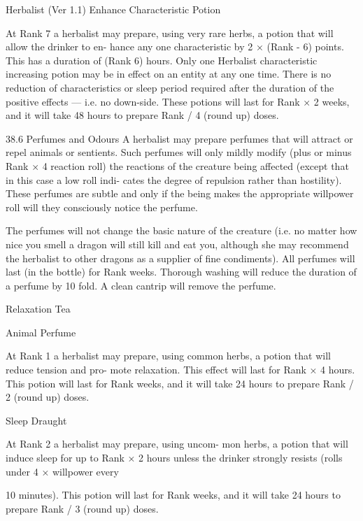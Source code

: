 \begin{Chapter}{Herbalist (Ver 1.1)}
Enhance Characteristic Potion 

At Rank 7 a herbalist may prepare, using very rare 
herbs,  a  potion  that  will  allow  the  drinker  to  en-
hance  any  one  characteristic  by  2  ×  (Rank  -  6) 
points. This has a duration of (Rank 6) hours. Only 
one  Herbalist  characteristic  increasing  potion  may 
be  in  effect  on  an  entity  at  any  one  time.  There  is 
no  reduction  of  characteristics  or  sleep  period 
required after the duration of the positive effects — 
i.e. no down-side. These potions will last for Rank 
×  2  weeks,  and  it  will  take  48  hours  to  prepare 
Rank / 4 (round up) doses. 

38.6 Perfumes and Odours 
A  herbalist  may  prepare  perfumes  that  will  attract 
or  repel  animals  or  sentients.  Such  perfumes  will 
only  mildly  modify  (plus  or  minus  Rank  ×  4%
reaction  roll)  the  reactions  of  the  creature  being 
affected  (except  that  in  this  case  a  low  roll  indi-
cates the degree  of repulsion rather than hostility). 
These  perfumes  are  subtle  and  only  if  the  being 
makes  the  appropriate  willpower  roll  will  they 
consciously notice the perfume. 

The  perfumes  will  not  change  the  basic  nature  of 
the  creature  (i.e.  no  matter  how  nice  you  smell  a 
dragon will still kill and eat you, although she may 
recommend  the  herbalist  to  other  dragons  as  a 
supplier of fine condiments). All perfumes will last 
(in  the  bottle)  for  Rank  weeks.  Thorough  washing 
will reduce the duration of a perfume by 10 fold. A 
clean cantrip will remove the perfume. 

Relaxation Tea 

Animal Perfume 

At Rank 1 a herbalist may prepare, using common 
herbs,  a  potion  that  will  reduce  tension  and  pro-
mote  relaxation.  This  effect  will  last  for  Rank  × 4 
hours. This potion will last for Rank weeks, and it 
will  take  24  hours  to  prepare  Rank  /  2  (round  up) 
doses. 

Sleep Draught 

At  Rank  2  a  herbalist  may  prepare,  using  uncom-
mon herbs, a potion that will induce sleep for up to 
Rank  ×  2  hours  unless  the  drinker  strongly  resists 
(rolls under 4 × willpower every 

10 minutes). This potion will  last for Rank weeks, 
and it will take 24 hours to prepare Rank / 3 (round 
up) doses. 


\end{Chapter}
